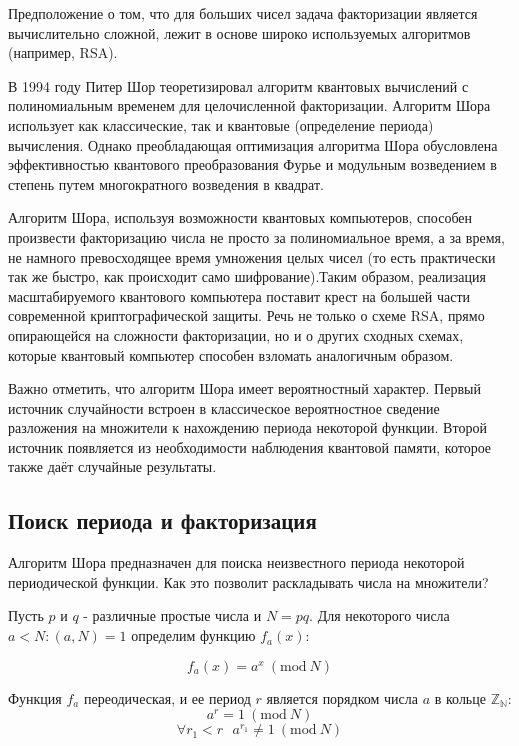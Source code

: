 \documentclass[14pt]{article}
\newcommand{\Mod}[1]{\ (\mathrm{mod}\ #1)}
\begin{document}
Предположение о том, что для больших чисел задача факторизации является вычислительно сложной, лежит в основе широко используемых алгоритмов (например, RSA).

В 1994 году Питер Шор теоретизировал алгоритм квантовых вычислений с полиномиальным временем для целочисленной факторизации. Алгоритм Шора использует как классические, так и квантовые (определение периода) вычисления. Однако преобладающая оптимизация алгоритма Шора обусловлена эффективностью квантового преобразования Фурье и модульным возведением в степень путем многократного возведения в квадрат.

Алгоритм Шора, используя возможности квантовых компьютеров, способен произвести факторизацию числа не просто за полиномиальное время, а за время, не намного превосходящее время умножения целых чисел (то есть практически так же быстро, как происходит само шифрование).Таким образом, реализация масштабируемого квантового компьютера поставит крест на большей части современной криптографической защиты. Речь не только о схеме RSA, прямо опирающейся на сложности факторизации, но и о других сходных схемах, которые квантовый компьютер способен взломать аналогичным образом.

Важно отметить, что алгоритм Шора имеет вероятностный характер. Первый источник случайности встроен в классическое вероятностное сведение разложения на множители к нахождению периода некоторой функции. Второй источник появляется из необходимости наблюдения квантовой памяти, которое также даёт случайные результаты.
	
	\newpage
	\subsection{Поиск периода и факторизация}
	Алгоритм Шора предназначен для поиска неизвестного периода некоторой периодической функции.
	Как это позволит раскладывать числа на множители?
	
	Пусть $p$ и $q$ - различные простые числа и $N = pq$. Для некоторого числа $a < N: (a, N) = 1$ определим функцию $f_a(x)$:
	
	\begin{equation}
		f_a(x) = a^x \Mod{N}
	\end{equation}
	
	Функция $f_a$ переодическая, и ее период $r$ является порядком числа $a$ в кольце $\mathbb{Z_N}$:
	\begin{equation}
		a^r = 1 \Mod{N}
	\end{equation}
	\begin{equation}
		\forall r_1 < r \text{ } a^{r_1} \neq 1 \Mod{N}
	\end{equation}
	
\end{document}
